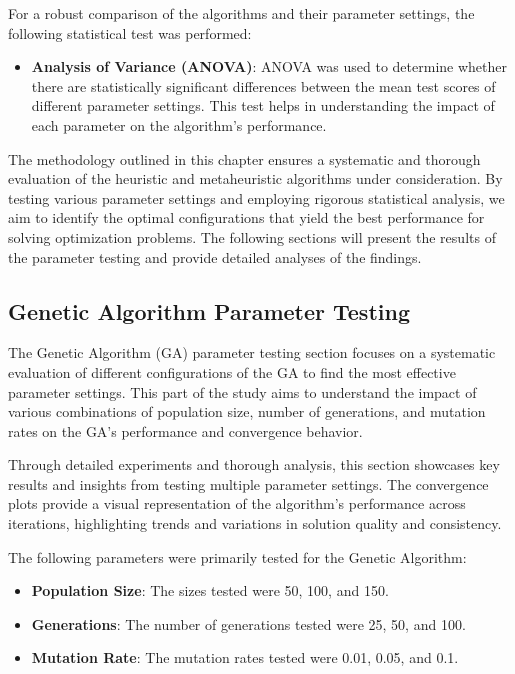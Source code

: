\documentclass{article}
\begin{document}
    For a robust comparison of the algorithms and their parameter settings, the following statistical test was performed:

    \begin{itemize}
        \item \textbf{Analysis of Variance (ANOVA)}: ANOVA was used to determine whether there are statistically significant differences between the mean test scores of different parameter settings. This test helps in understanding the impact of each parameter on the algorithm's performance.
    \end{itemize}


    The methodology outlined in this chapter ensures a systematic and thorough evaluation of the heuristic and metaheuristic algorithms under consideration. By testing various parameter settings and employing rigorous statistical analysis, we aim to identify the optimal configurations that yield the best performance for solving optimization problems. The following sections will present the results of the parameter testing and provide detailed analyses of the findings.


    \newpage


    \subsection{Genetic Algorithm Parameter Testing}
    The Genetic Algorithm (GA) parameter testing section focuses on a systematic evaluation of different configurations of the GA to find the most effective parameter settings. This part of the study aims to understand the impact of various combinations of population size, number of generations, and mutation rates on the GA's performance and convergence behavior.

    Through detailed experiments and thorough analysis, this section showcases key results and insights from testing multiple parameter settings. The convergence plots provide a visual representation of the algorithm's performance across iterations, highlighting trends and variations in solution quality and consistency.

    The following parameters were primarily tested for the Genetic Algorithm:

    \begin{itemize}
        \item \textbf{Population Size}: The sizes tested were 50, 100, and 150.
        \item \textbf{Generations}: The number of generations tested were 25, 50, and 100.
        \item \textbf{Mutation Rate}: The mutation rates tested were 0.01, 0.05, and 0.1.
    \end{itemize}
\end{document}
